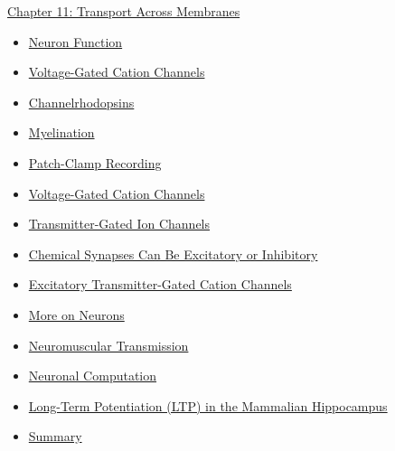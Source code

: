 \documentclass[12pt,letterpaper]{article}
\begin{document}
\begin{chapbox}{\hyperlink{home}{Chapter 11: Transport Across Membranes}}
\begin{enumerate}
\begin{itemize}
                \item \hyperlink{11.3.6}{Neuron Function}
                \item \hyperlink{11.3.7}{Voltage-Gated Cation Channels}
                \item \hyperlink{11.3.8}{Channelrhodopsins}
                \item \hyperlink{11.3.9}{Myelination}
                \item \hyperlink{11.3.10}{Patch-Clamp Recording}
                \item \hyperlink{11.3.11}{Voltage-Gated Cation Channels}
                \item \hyperlink{11.3.12}{Transmitter-Gated Ion Channels}
                \item \hyperlink{11.3.13}{Chemical Synapses Can Be Excitatory or Inhibitory}
                \item \hyperlink{11.3.14}{Excitatory Transmitter-Gated Cation Channels}
                \item \hyperlink{11.3.15}{More on Neurons}
                \item \hyperlink{11.3.16}{Neuromuscular Transmission}
                \item \hyperlink{11.3.17}{Neuronal Computation}
                \item \hyperlink{11.3.18}{Long-Term Potentiation (LTP) in the Mammalian Hippocampus}
                \item \hyperlink{11.3.r}{Summary}
            \end{itemize}
    \end{enumerate}
\end{chapbox}
\end{document}
